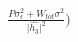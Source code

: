 \documentclass[preview]{standalone}
\begin{document}
\begin{align*}
\frac{P \sigma_\epsilon^2 + W_{tot} \sigma^2}{\big|\hat{h_3}\big|^2}\big)
\end{align*}
\end{document}
